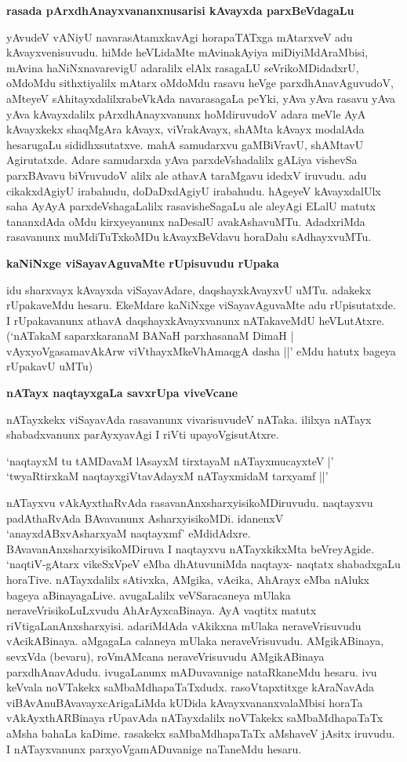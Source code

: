 \noindent
{\bf\large{rasada pArxdhAnayxvananxnusarisi kAvayxda parxBeVdagaLu}}\label{page240}

yAvudeV vANiyU navarasAtamxkavAgi horapaTATxga mAtarxveV adu kAvayxvenisuvudu. hiMde heVLidaMte mAvinakAyiya miDiyiMdAraMbisi, mAvina haNiNxnavarevigU adaralilx elAlx rasagaLU seVrikoMDidadxrU, oMdoMdu sithxtiyalilx mAtarx oMdoMdu rasavu heVge parxdhAnavAguvudoV, aMteyeV sAhitayxdalilxrabeVkAda navarasagaLa peYki, yAva yAva rasavu yAva yAva kAvayxdalilx pArxdhAnayxvanunx hoMdiruvudoV adara meVle AyA kAvayxkekx shaqMgAra kAvayx, viVrakAvayx, shAMta kAvayx modalAda hesarugaLu sididhxsutatxve. mahA samudarxvu gaMBiVravU, shAMtavU Agirutatxde. Adare samudarxda yAva parxdeVshadalilx gALiya vishevSa parxBAvavu biVruvudoV alilx ale athavA taraMgavu idedxV iruvudu. adu cikakxdAgiyU irabahudu, doDaDxdAgiyU irabahudu. hAgeyeV kAvayxdalUlx saha AyAyA parxdeVshagaLalilx rasavisheSagaLu ale aleyAgi ELalU matutx tananxdAda oMdu kirxyeyanunx naDesalU avakAshavuMTu. AdadxriMda rasavanunx muMdiTuTxkoMDu kAvayxBeVdavu horaDalu sAdhayxvuMTu.

\noindent
{\bf\large{kaNiNxge viSayavAguvaMte rUpisuvudu rUpaka}}\label{page241}

idu sharxvayx kAvayxda viSayavAdare, daqshayxkAvayxvU uMTu. adakekx rUpakaveMdu hesaru. EkeMdare kaNiNxge viSayavAguvaMte adu rUpisutatxde. I rUpakavanunx athavA daqshayxkAvayxvanunx nATakaveMdU heVLutAtxre. (`nATakaM saparxkaranaM\label{241} BANaH parxhasanaM DimaH | vAyxyoVgasamavAkArw viVthayxMkeVhAmaqgA dasha ||' eMdu hatutx bageya rUpakavU uMTu)

\noindent
{\bf\large{nATayx naqtayxgaLa savxrUpa viveVcane}}\label{page241}

nATayxkekx viSayavAda rasavanunx vivarisuvudeV nATaka. ililxya nATayx shabadxvanunx parAyxyavAgi I riVti upayoVgisutAtxre.

\begin{shloka}
`naqtayxM tu tAMDavaM lAsayxM tirxtayaM nATayxmucayxteV |'\\\label{241}
`twyaRtirxkaM naqtayxgiVtavAdayxM nATayxmidaM tarxyamf ||\label{241}'
\end{shloka}

nATayxvu vAkAyxthaRvAda rasavanAnxsharxyisikoMDiruvudu. naqtayxvu padAthaRvAda BAvavanunx AsharxyisikoMDi. idanenxV `anayxdABxvAsharxyaM naqtayxmf'\label{241} eMdidAdxre. BAvavanAnxsharxyisikoMDiruva I naqtayxvu nATayxkikxMta beVreyAgide. `naqtiV-gAtarx vikeSxVpeV eMba dhAtuvuniMda naqtayx- naqtatx shabadxgaLu horaTive. nATayxdalilx sAtivxka, AMgika, vAcika, AhArayx eMba nAlukx bageya aBinayagaLive. avugaLalilx veVSaracaneya mUlaka neraveVrisikoLuLxvudu AhArAyxcaBinaya. AyA vaqtitx matutx riVtigaLanAnxsharxyisi. adariMdAda vAkikxna mUlaka neraveVrisuvudu vAcikABinaya. aMgagaLa calaneya mUlaka neraveVrisuvudu. AMgikABinaya, sevxVda (bevaru), roVmAMcana neraveVrisuvudu AMgikABinaya parxdhAnavAdudu. ivugaLanunx mADuvavanige nataRkaneMdu hesaru. ivu keVvala noVTakekx saMbaMdhapaTaTxdudx. rasoVtapxtitxge kAraNavAda viBAvAnuBAvavayxcArigaLiMda kUDida kAvayxvananxvalaMbisi horaTa vAkAyxthARBinaya rUpavAda nATayxdalilx noVTakekx saMbaMdhapaTaTx aMsha bahaLa kaDime. rasakekx saMbaMdhapaTaTx aMshaveV jAsitx iruvudu. I nATayxvanunx parxyoVgamADuvanige naTaneMdu hesaru.

